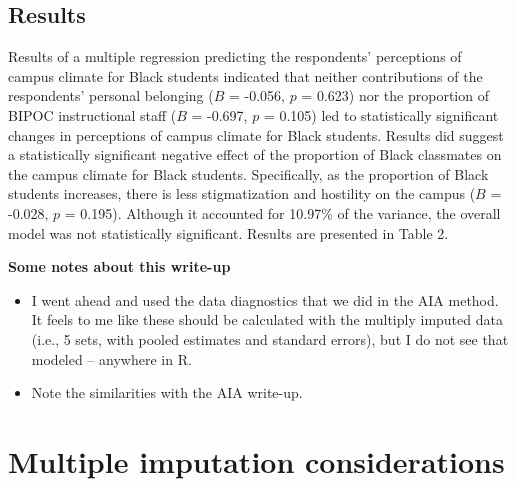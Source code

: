 \documentclass[
]{book}
\providecommand{\tightlist}{%
  \setlength{\itemsep}{0pt}\setlength{\parskip}{0pt}}
\begin{document}
\hypertarget{results-1}{%
\subsection{Results}\label{results-1}}

Results of a multiple regression predicting the respondents' perceptions of campus climate for Black students indicated that neither contributions of the respondents' personal belonging (\(B\) = -0.056, \(p\) = 0.623) nor the proportion of BIPOC instructional staff (\(B\) = -0.697, \(p\) = 0.105) led to statistically significant changes in perceptions of campus climate for Black students. Results did suggest a statistically significant negative effect of the proportion of Black classmates on the campus climate for Black students. Specifically, as the proportion of Black students increases, there is less stigmatization and hostility on the campus (\(B\) = -0.028, \(p\) = 0.195). Although it accounted for 10.97\% of the variance, the overall model was not statistically significant. Results are presented in Table 2.

\textbf{Some notes about this write-up}

\begin{itemize}
\tightlist
\item
  I went ahead and used the data diagnostics that we did in the AIA method. It feels to me like these should be calculated with the multiply imputed data (i.e., 5 sets, with pooled estimates and standard errors), but I do not see that modeled -- anywhere in R.
\item
  Note the similarities with the AIA write-up.
\end{itemize}

\hypertarget{multiple-imputation-considerations}{%
\section{Multiple imputation considerations}\label{multiple-imputation-considerations}}
\end{document}
